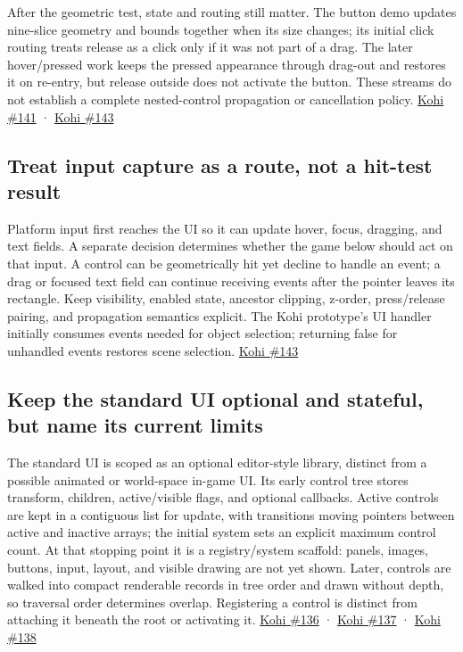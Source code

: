 After the geometric test, state and routing still matter. The button demo updates nine-slice geometry and bounds together when its size changes; its initial click routing treats release as a click only if it was not part of a drag. The later hover/pressed work keeps the pressed appearance through drag-out and restores it on re-entry, but release outside does not activate the button. These streams do not establish a complete nested-control propagation or cancellation policy. \href{https://www.youtube.com/watch?v=VuPFUCVGy9U}{Kohi \#141} · \href{https://www.youtube.com/watch?v=jLSfss8YrXE}{Kohi \#143}

\subsection{Treat input capture as a route, not a hit-test result}\label{05-engine-i-ch013-treat-input-capture-as-a-route-not-a-hit-test-result}

Platform input first reaches the UI so it can update hover, focus, dragging, and text fields. A separate decision determines whether the game below should act on that input. A control can be geometrically hit yet decline to handle an event; a drag or focused text field can continue receiving events after the pointer leaves its rectangle. Keep visibility, enabled state, ancestor clipping, z-order, press/release pairing, and propagation semantics explicit. The Kohi prototype's UI handler initially consumes events needed for object selection; returning false for unhandled events restores scene selection. \href{https://www.youtube.com/watch?v=jLSfss8YrXE}{Kohi \#143}

\subsection{Keep the standard UI optional and stateful, but name its current limits}\label{05-engine-i-ch013-keep-the-standard-ui-optional-and-stateful-but-name-its-current-limits}

The standard UI is scoped as an optional editor-style library, distinct from a possible animated or world-space in-game UI. Its early control tree stores transform, children, active/visible flags, and optional callbacks. Active controls are kept in a contiguous list for update, with transitions moving pointers between active and inactive arrays; the initial system sets an explicit maximum control count. At that stopping point it is a registry/system scaffold: panels, images, buttons, input, layout, and visible drawing are not yet shown. Later, controls are walked into compact renderable records in tree order and drawn without depth, so traversal order determines overlap. Registering a control is distinct from attaching it beneath the root or activating it. \href{https://www.youtube.com/watch?v=IGt08az4bLA}{Kohi \#136} · \href{https://www.youtube.com/watch?v=ptdE4nbVN0U}{Kohi \#137} · \href{https://www.youtube.com/watch?v=xqExSNvOc6A}{Kohi \#138}

